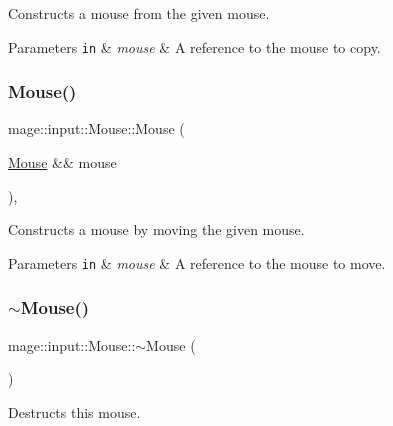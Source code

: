 Constructs a mouse from the given mouse.


\begin{DoxyParams}[1]{Parameters}
\mbox{\tt in}  & {\em mouse} & A reference to the mouse to copy. \\
\hline
\end{DoxyParams}
\mbox{\label{classmage_1_1input_1_1_mouse_a6e8185b9b2f0fdcd63a191389eb2b050}} 
\subsubsection{\texorpdfstring{Mouse()}{Mouse()}\hspace{0.1cm}{\footnotesize\ttfamily [3/3]}}
{\footnotesize\ttfamily mage\+::input\+::\+Mouse\+::\+Mouse (\begin{DoxyParamCaption}\item[{\mbox{\hyperlink{classmage_1_1input_1_1_mouse}{Mouse}} \&\&}]{mouse }\end{DoxyParamCaption})\hspace{0.3cm}{\ttfamily [default]}, {\ttfamily [noexcept]}}

Constructs a mouse by moving the given mouse.


\begin{DoxyParams}[1]{Parameters}
\mbox{\tt in}  & {\em mouse} & A reference to the mouse to move. \\
\hline
\end{DoxyParams}
\mbox{\label{classmage_1_1input_1_1_mouse_abfc6391c896b029e38ffa1341dcf9963}} 
\subsubsection{\texorpdfstring{$\sim$\+Mouse()}{~Mouse()}}
{\footnotesize\ttfamily mage\+::input\+::\+Mouse\+::$\sim$\+Mouse (\begin{DoxyParamCaption}{ }\end{DoxyParamCaption})\hspace{0.3cm}{\ttfamily [default]}}

Destructs this mouse. 

